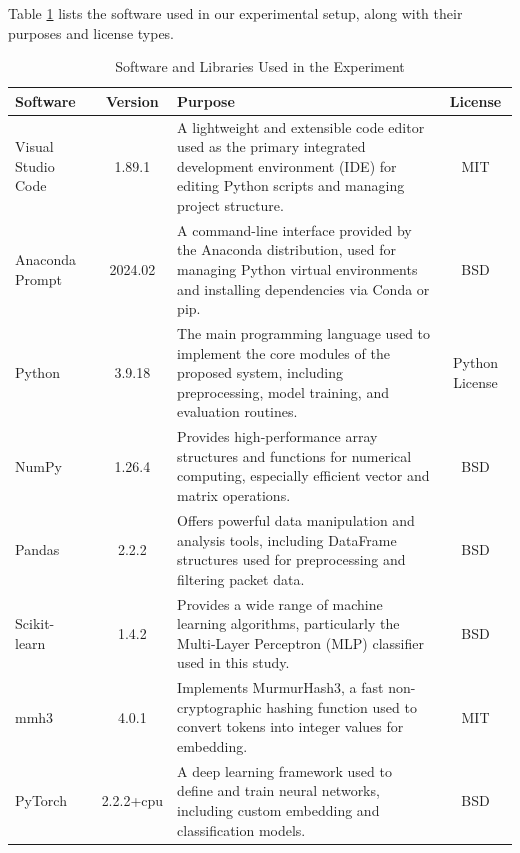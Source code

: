\begin{ZhChapter}
    Table \ref{tab:software} lists the software used in our experimental setup, along with their purposes and license types.

    \begin{table}[htbp]
        \centering
        \caption{Software and Libraries Used in the Experiment}
        \label{tab:software}
        \begin{tabular}{|l|c|p{7cm}|c|}
            \hline
            \textbf{Software}                & \textbf{Version} & \textbf{Purpose}                                                                                                                                                 & \textbf{License} \\ \hline
            Visual Studio Code~\cite{vscode} & 1.89.1           & A lightweight and extensible code editor used as the primary integrated development environment (IDE) for editing Python scripts and managing project structure. & MIT              \\ \hline
            Anaconda Prompt~\cite{anaconda}  & 2024.02          & A command-line interface provided by the Anaconda distribution, used for managing Python virtual environments and installing dependencies via Conda or pip.      & BSD              \\ \hline
            Python~\cite{python}             & 3.9.18           & The main programming language used to implement the core modules of the proposed system, including preprocessing, model training, and evaluation routines.       & Python License   \\ \hline
            NumPy~\cite{numpy}               & 1.26.4           & Provides high-performance array structures and functions for numerical computing, especially efficient vector and matrix operations.                             & BSD              \\ \hline
            Pandas~\cite{pandas}             & 2.2.2            & Offers powerful data manipulation and analysis tools, including DataFrame structures used for preprocessing and filtering packet data.                           & BSD              \\ \hline
            Scikit-learn~\cite{scikit-learn} & 1.4.2            & Provides a wide range of machine learning algorithms, particularly the Multi-Layer Perceptron (MLP) classifier used in this study.                               & BSD              \\ \hline
            mmh3~\cite{mmh3}                 & 4.0.1            & Implements MurmurHash3, a fast non-cryptographic hashing function used to convert tokens into integer values for embedding.                                      & MIT              \\ \hline
            PyTorch~\cite{torch}             & 2.2.2+cpu        & A deep learning framework used to define and train neural networks, including custom embedding and classification models.                                        & BSD              \\ \hline
        \end{tabular}
    \end{table}




\end{ZhChapter}
